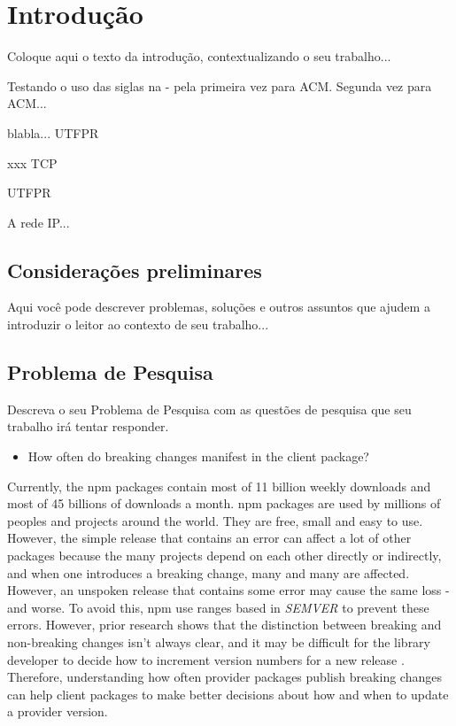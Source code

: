 \chapter{Introdução}
\label{cap:introducao}

Coloque aqui o texto da introdução, contextualizando o seu trabalho...

Testando o uso das siglas na - pela primeira vez para \gls{ACM}. Segunda vez para \gls{ACM}...

blabla... \gls{UTFPR}

xxx \gls{TCP}

\acrlong{UTFPR}

A rede \gls{IP}...

\section{Considerações preliminares}

Aqui você pode descrever problemas, soluções e outros assuntos que ajudem a introduzir o leitor ao contexto de seu trabalho...

\section{Problema de Pesquisa}
\label{cap:introducao:sec:problema:pesquisa}

Descreva o seu Problema de Pesquisa com as questões de pesquisa que seu trabalho irá tentar responder.

\begin{itemize}
    \item How often do breaking changes manifest in the client package?
\end{itemize}
Currently, the npm packages contain most of 11 billion weekly downloads and most of 45 billions of downloads a month. npm packages are used by millions of peoples and projects around the world. They are free, small and easy to use. However, the simple release that contains an error can affect a lot of other packages because the many projects depend on each other directly or indirectly, and when one introduces a breaking change, many and many are affected. However, an unspoken release that contains some error may cause the same loss - and worse. To avoid this, npm use ranges based in \textit{SEMVER} to prevent these errors. However, prior research shows that the distinction between breaking and non-breaking changes isn't always clear, and it may be difficult for the library developer to decide how to increment version numbers for a new release \cite{noregrets2018}. Therefore, understanding how often provider packages publish breaking changes can help client packages to make better decisions about how and when to update a provider version.

